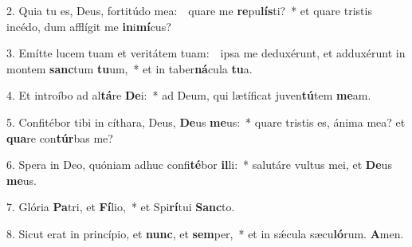 
2. Quia tu es, Deus, fortitúdo mea:~\GreDagger\ quare me \textbf{re}pu\textbf{lís}ti?~* et quare tristis incédo, dum afflígit me \textbf{in}i\textbf{mí}cus?

3. Emítte lucem tuam et veritátem tuam:~\GreDagger\ ipsa me deduxérunt, et adduxérunt in montem \textbf{sanc}tum \textbf{tu}um,~* et in taber\textbf{ná}cula \textbf{tu}a.

4. Et introíbo ad al\textbf{tá}re \textbf{De}i:~* ad Deum, qui lætíficat juven\textbf{tú}tem \textbf{me}am.

5. Confitébor tibi in cíthara, Deus, \textbf{De}us \textbf{me}us:~* quare tristis es, ánima mea? et \textbf{qua}re con\textbf{túr}bas me?

6. Spera in Deo, quóniam adhuc confi\textbf{té}bor \textbf{il}li:~* salutáre vultus mei, et \textbf{De}us \textbf{me}us.

7. Glória \textbf{Pa}tri, et \textbf{Fí}lio,~* et Spi\textbf{rí}tui \textbf{Sanc}to.

8. Sicut erat in princípio, et \textbf{nunc}, et \textbf{sem}per,~* et in s\'{\ae}cula sæcu\textbf{ló}rum. \textbf{A}men.